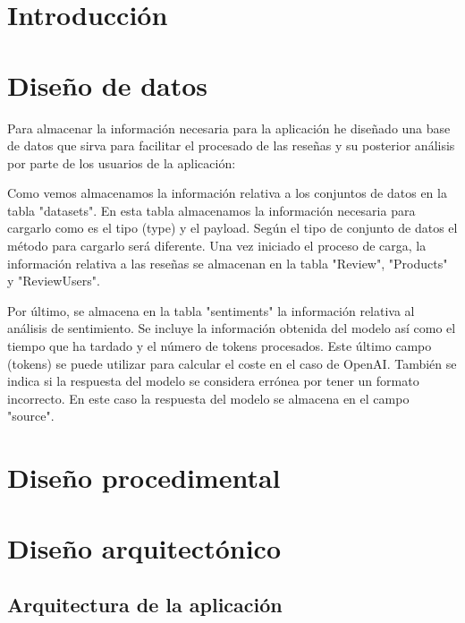 
\section{Introducción}

\section{Diseño de datos}
Para almacenar la información necesaria para la aplicación he diseñado una base de datos 
que sirva para facilitar el procesado de las reseñas y su posterior análisis 
por parte de los usuarios de la aplicación:


Como vemos almacenamos la información relativa a los conjuntos de datos en la tabla "datasets".
En esta tabla almacenamos la información necesaria para cargarlo como es el tipo (type) y el payload.
Según el tipo de conjunto de datos el método para cargarlo será diferente.
Una vez iniciado el proceso de carga, la información relativa a las reseñas se almacenan en la tabla "Review", "Products" y "ReviewUsers".

Por último, se almacena en la tabla "sentiments" la información relativa al análisis de sentimiento.
Se incluye la información obtenida del modelo así como el tiempo que ha tardado y el número de tokens procesados.
Este último campo (tokens) se puede utilizar para calcular el coste en el caso de OpenAI.
También se indica si la respuesta del modelo se considera errónea por tener un formato incorrecto. 
En este caso la respuesta del modelo se almacena en el campo "source".

\section{Diseño procedimental}



\section{Diseño arquitectónico}

\subsection{Arquitectura de la aplicación}


